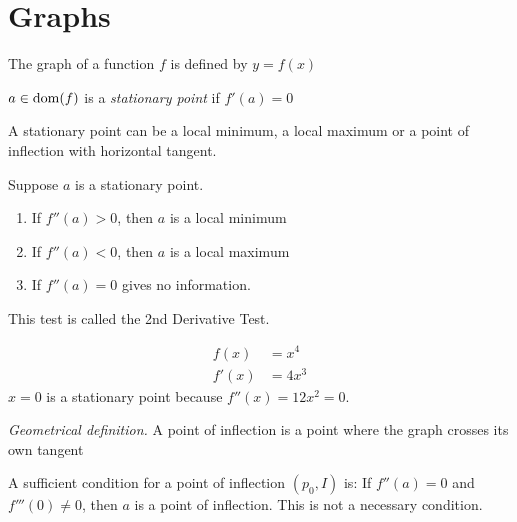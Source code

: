 \section{Graphs}
\begin{df}
The graph of a function $f$ is defined by $y=f(x)$
\end{df}
\begin{df}
$a \in \operatorname{dom} (f)$ is a \emph{stationary point} if $f'(a) = 0$
\end{df}
\begin{rk}
A stationary point can be a local minimum, a local maximum or a point of inflection with horizontal tangent.
\end{rk}
Suppose $a$ is a stationary point.
\begin{enumerate}
\item
If $f''(a) > 0$, then $a$ is a local minimum
\item
If $f''(a) < 0$, then $a$ is a local maximum
\item
If $f''(a) = 0$ gives no information.
\end{enumerate}
This test is called the 2nd Derivative Test.
\begin{ex}
\begin{align*}
f(x) & = x^4 \\
f'(x) & = 4x^3
\end{align*}
$x=0$ is a stationary point because
$f''(x) = 12 x^2 =0$.
\end{ex}

\emph{Geometrical definition.}
A point of inflection is a point where the graph crosses its own tangent

A sufficient condition for a point of inflection $(p_0, I)$ is:
If $f''(a) = 0 $ and $f'''(0) \neq 0$, then $a$ is a point of inflection.
This is not a necessary condition.

